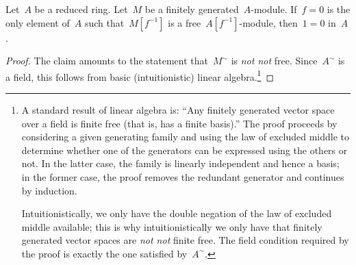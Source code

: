 \documentclass{ws-rv9x6}
\newcommand{\defeq}{\vcentcolon=}
\renewcommand{\_}{\mathpunct{.}}
\newcommand{\?}{\,{:}\,}
\newcommand{\notnot}{\emph{not not}\xspace}
\newcommand{\negg}{\neg\!\!\!\neg}
\newcommand{\bott}{\bot\!\!\!\!\bot}
\begin{document}
%
%
%
%

\begin{proposition}
\label{thm:baby-grothendieck}
Let~$A$ be a reduced ring. Let~$M$ be a finitely generated~$A$-module.
If~$f = 0$ is the only element of~$A$ such that~$M[f^{-1}]$ is a
free~$A[f^{-1}]$-module, then~$1 = 0$ in~$A$.
\end{proposition}

\begin{proof}The claim amounts to the statement that~$M^\sim$ is \emph{not not}
free. Since~$A^\sim$ is a field, this follows from
basic (intuitionistic) linear algebra.\footnote{A standard result of linear
algebra is: ``Any finitely generated vector space over a field is finite free
(that is, has a finite basis).'' The proof proceeds by considering a given
generating family and using the law of excluded middle to determine whether one
of the generators can be expressed using the others or not. In the latter case,
the family is linearly independent and hence a basis; in the former case, the
proof removes the redundant generator and continues by induction.

Intuitionistically, we only have the double negation of the law of excluded
middle available; this is why intuitionistically we only have that finitely
generated vector spaces are \notnot finite free. The field condition required
by the proof is exactly the one satisfied by~$A^\sim$.}\end{proof}
\end{document}
